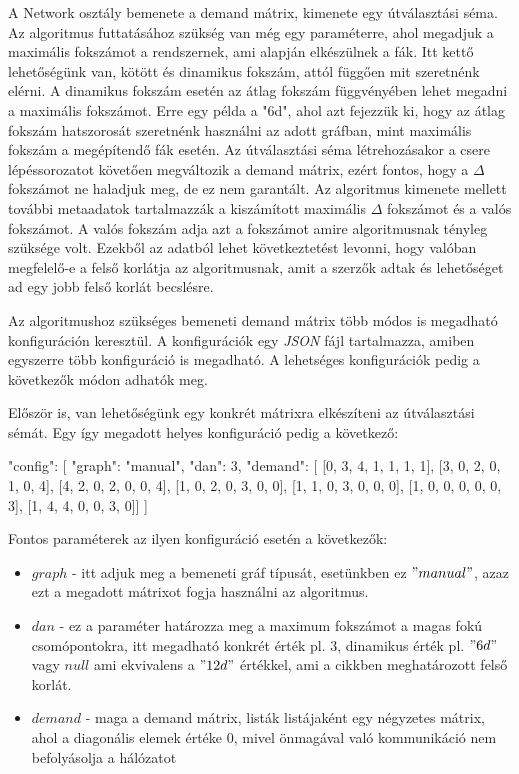\documentclass[12pt]{report}
\begin{document}
A Network osztály bemenete a demand mátrix, kimenete egy útválasztási séma.
Az algoritmus futtatásához szükség van még egy paraméterre, ahol megadjuk a maximális fokszámot a rendszernek, ami alapján elkészülnek a fák.
Itt kettő lehetőségünk van, kötött és dinamikus fokszám, attól függően mit szeretnénk elérni.
A dinamikus fokszám esetén az átlag fokszám függvényében lehet megadni a maximális fokszámot.
Erre egy példa a "6d", ahol azt fejezzük ki, hogy az átlag fokszám hatszorosát szeretnénk használni az adott gráfban, mint maximális fokszám a megépítendő fák esetén.
Az útválasztási séma létrehozásakor a csere lépéssorozatot követően megváltozik a demand mátrix, ezért fontos, hogy a \(\Delta\) fokszámot ne haladjuk meg, de ez nem garantált.
Az algoritmus kimenete mellett további metaadatok tartalmazzák a kiszámított maximális $\Delta$ fokszámot és a valós fokszámot.
A valós fokszám adja azt a fokszámot amire algoritmusnak tényleg szüksége volt.  
Ezekből az adatból lehet következtetést levonni, hogy valóban megfelelő-e a felső korlátja az algoritmusnak, amit a szerzők adtak és lehetőséget ad egy jobb felső korlát becslésre. 


Az algoritmushoz szükséges bemeneti demand mátrix több módos is megadható konfiguráción keresztül.
A konfigurációk egy  \textit{JSON} fájl tartalmazza, amiben egyszerre több konfiguráció is megadható. 
A lehetséges konfigurációk pedig a következők módon adhatók meg.

Először is, van lehetőségünk egy konkrét mátrixra elkészíteni az útválasztási sémát.
Egy így megadott helyes konfiguráció pedig a következő:

\pagebreak

\begin{mintedJson}
	{
		"config": [
		{ 
			"graph": "manual",
			"dan": 3,
			"demand": [
			[0, 3, 4, 1, 1, 1, 1],
			[3, 0, 2, 0, 1, 0, 4],
			[4, 2, 0, 2, 0, 0, 4],
			[1, 0, 2, 0, 3, 0, 0],
			[1, 1, 0, 3, 0, 0, 0],
			[1, 0, 0, 0, 0, 0, 3],
			[1, 4, 4, 0, 0, 3, 0]]	
		} ]
	}
\end{mintedJson}

Fontos paraméterek az ilyen konfiguráció esetén a következők:
\begin{itemize}
	\item $graph$ - itt adjuk meg a bemeneti gráf típusát, esetünkben ez $"manual"$, azaz ezt a megadott mátrixot fogja használni az algoritmus.
	\item $dan$ - ez a paraméter határozza meg a maximum fokszámot a magas fokú csomópontokra, itt megadható konkrét érték pl. 3, dinamikus érték pl. $"6d"$ vagy $null$ ami ekvivalens a $"12d"$ értékkel, ami a cikkben \cite{avin_demand-aware_nodate} meghatározott felső korlát.
	\item $demand$ - maga a demand mátrix, listák listájaként egy négyzetes mátrix, ahol a diagonális elemek értéke $0$, mivel önmagával való kommunikáció nem befolyásolja a hálózatot
\end{itemize}
\end{document}
